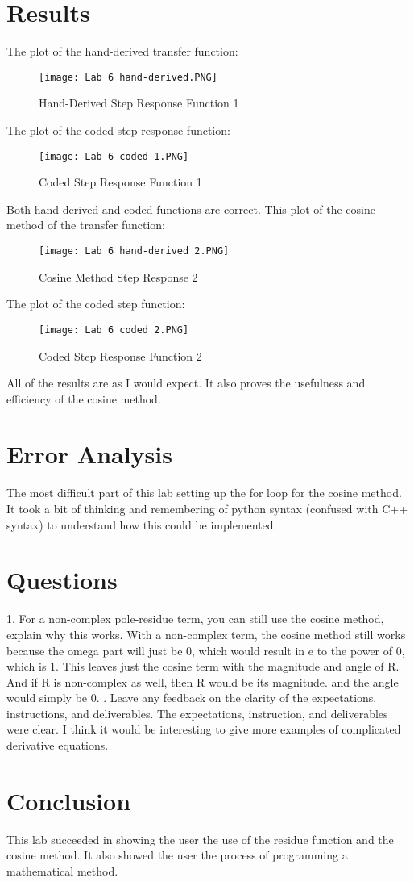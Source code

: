 \documentclass[12pt]{article}
\begin{document}
\section{Results}
The plot of the hand-derived transfer function:
\begin{figure}[H]
\texttt{[image: Lab 6 hand-derived.PNG]}
  \caption{Hand-Derived Step Response Function 1}
  \end{figure}
The plot of the coded step response function:
\begin{figure}[H]
\texttt{[image: Lab 6 coded 1.PNG]}
  \caption{Coded Step Response Function 1}
  \end{figure}
Both hand-derived and coded functions are correct.
This plot of the cosine method of the transfer function:  
  \begin{figure}[H]
\texttt{[image: Lab 6 hand-derived 2.PNG]}
  \caption{Cosine Method Step Response 2}
  \end{figure}
The plot of the coded step function: 
\begin{figure}[H]
\texttt{[image: Lab 6 coded 2.PNG]}
  \caption{Coded Step Response Function 2}
  \end{figure}
All of the results are as I would expect. It also proves the usefulness and efficiency of the cosine method.
\section{Error Analysis}
The most difficult part of this lab setting up the for loop for the cosine method. It took a bit of thinking and remembering of python syntax (confused with C++ syntax) to understand how this could be implemented.
\section{Questions}
1. For a non-complex pole-residue term, you can still use the cosine method, explain why this
works.
\newline
With a non-complex term, the cosine method still works because the omega part will just be 0, which would result in e to the power of 0, which is 1. This leaves just the cosine term with the magnitude and angle of R. And if R is non-complex as well, then R would be its magnitude. and the angle would simply be 0.
. Leave any feedback on the clarity of the expectations, instructions, and deliverables.\newline
The expectations, instruction, and deliverables were clear. I think it would be interesting to give more examples of complicated derivative equations.
\section{Conclusion}
This lab succeeded in showing the user the use of the residue function and the cosine method. It also showed the user the process of programming a mathematical method.
\end{document}
